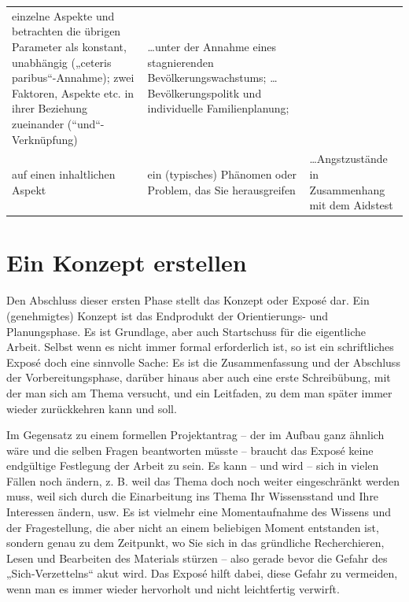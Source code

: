 \documentclass[]{book}
\theoremstyle{definition}
\theoremstyle{definition}
\theoremstyle{definition}
\theoremstyle{remark}
\begin{document}
\begin{longtable}[]{@{}lll@{}}
\begin{minipage}[t]{0.30\columnwidth}
einzelne Aspekte und betrachten die übrigen Parameter als konstant,
unabhängig („ceteris paribus``-Annahme); zwei Faktoren, Aspekte etc. in
ihrer Beziehung zueinander (``und``-Verknüpfung)\strut
\end{minipage} & \begin{minipage}[t]{0.30\columnwidth}\raggedright\strut
\ldots{}unter der Annahme eines stagnierenden Bevölkerungswachstums;
\ldots{}Bevölkerungspolitk und individuelle
Familienplanung;\vspace{5mm}\strut
\end{minipage}\tabularnewline
\begin{minipage}[t]{0.31\columnwidth}\raggedright\strut
auf einen inhaltlichen Aspekt\strut
\end{minipage} & \begin{minipage}[t]{0.30\columnwidth}\raggedright\strut
ein (typisches) Phänomen oder Problem, das Sie herausgreifen\strut
\end{minipage} & \begin{minipage}[t]{0.30\columnwidth}\raggedright\strut
\ldots{}Angstzustände in Zusammenhang mit dem Aidstest\vspace{5mm}\strut
\end{minipage}\tabularnewline
\bottomrule
\end{longtable}

\section{Ein Konzept erstellen}\label{ein-konzept-erstellen}

Den Abschluss dieser ersten Phase stellt das Konzept oder Exposé dar.
Ein (genehmigtes) Konzept ist das Endprodukt der Orientierungs- und
Planungsphase. Es ist Grundlage, aber auch Startschuss für die
eigentliche Arbeit. Selbst wenn es nicht immer formal erforderlich ist,
so ist ein schriftliches Exposé doch eine sinnvolle Sache: Es ist die
Zusammenfassung und der Abschluss der Vorbereitungsphase, darüber hinaus
aber auch eine erste Schreibübung, mit der man sich am Thema versucht,
und ein Leitfaden, zu dem man später immer wieder zurückkehren kann und
soll.

Im Gegensatz zu einem formellen Projektantrag -- der im Aufbau ganz
ähnlich wäre und die selben Fragen beantworten müsste -- braucht das
Exposé keine endgültige Festlegung der Arbeit zu sein. Es kann -- und
wird -- sich in vielen Fällen noch ändern, z. B. weil das Thema doch
noch weiter eingeschränkt werden muss, weil sich durch die Einarbeitung
ins Thema Ihr Wissensstand und Ihre Interessen ändern, usw. Es ist
vielmehr eine Momentaufnahme des Wissens und der Fragestellung, die aber
nicht an einem beliebigen Moment entstanden ist, sondern genau zu dem
Zeitpunkt, wo Sie sich in das gründliche Recherchieren, Lesen und
Bearbeiten des Materials stürzen -- also gerade bevor die Gefahr des
„Sich-Verzettelns`` akut wird. Das Exposé hilft dabei, diese Gefahr zu
vermeiden, wenn man es immer wieder hervorholt und nicht leichtfertig
verwirft.
\end{document}
